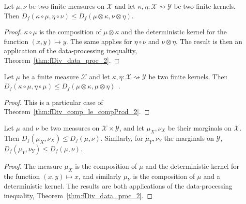 \begin{theorem}
  \label{thm:fDiv_comp_le_compProd_2}
  Let $\mu, \nu$ be two finite measures on $\mathcal X$ and let $\kappa, \eta : \mathcal X \rightsquigarrow \mathcal Y$ be two finite kernels.
  Then $D_f(\kappa \circ \mu, \eta \circ \nu) \le D_f(\mu \otimes \kappa, \nu \otimes \eta)$.
\end{theorem}

\begin{proof}%
{}
$\kappa \circ \mu$ is the composition of $\mu \otimes \kappa$ and the deterministic kernel for the function $(x,y) \mapsto y$. The same applies for $\eta \circ \nu$ and $\nu \otimes \eta$.
The result is then an application of the data-processing inequality, Theorem~\ref{thm:fDiv_data_proc_2}.
\end{proof}


\begin{theorem}
  \label{thm:fDiv_comp_le_condFDiv_2}
  Let $\mu$ be a finite measure $\mathcal X$ and let $\kappa, \eta : \mathcal X \rightsquigarrow \mathcal Y$ be two finite kernels.
  Then $D_f(\kappa \circ \mu, \eta \circ \mu) \le D_f(\mu \otimes \kappa, \mu \otimes \eta)$~.
\end{theorem}

\begin{proof}%
{}
This is a particular case of Theorem~\ref{thm:fDiv_comp_le_compProd_2}.
\end{proof}


\begin{theorem}[Marginals]
  \label{thm:fDiv_fst_le_2}
  Let $\mu$ and $\nu$ be two measures on $\mathcal X \times \mathcal Y$, and let $\mu_X, \nu_X$ be their marginals on $\mathcal X$.
  Then $D_f(\mu_X, \nu_X) \le D_f(\mu, \nu)$.
  Similarly, for $\mu_Y, \nu_Y$ the marginals on $\mathcal Y$, $D_f(\mu_Y, \nu_Y) \le D_f(\mu, \nu)$.
\end{theorem}

\begin{proof}%
{}
The measure $\mu_X$ is the composition of $\mu$ and the deterministic kernel for the function $(x,y) \mapsto x$, and similarly $\mu_Y$ is the composition of $\mu$ and a deterministic kernel.
The results are both applications of the data-processing inequality, Theorem~\ref{thm:fDiv_data_proc_2}.
\end{proof}




